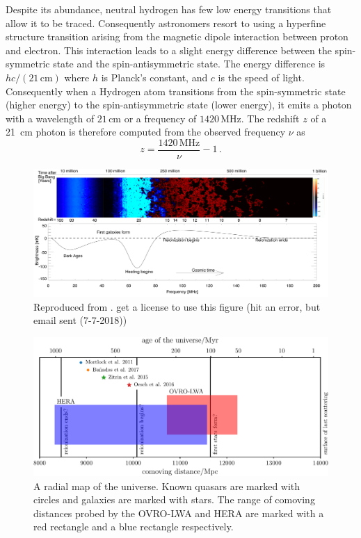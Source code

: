 \begin{bibunit}
Despite its abundance, neutral hydrogen has few low energy transitions that allow it to be traced.
Consequently astronomers resort to using a hyperfine structure transition arising from the magnetic
dipole interaction between proton and electron. This interaction leads to a slight energy difference
between the spin-symmetric state and the spin-antisymmetric state. The energy difference is $hc /
(21\,\text{cm})$ where $h$ is Planck's constant, and $c$ is the speed of light. Consequently when a
Hydrogen atom transitions from the spin-symmetric state (higher energy) to the spin-antisymmetric
state (lower energy), it emits a photon with a wavelength of $21\,\text{cm}$ or a frequency of
$1420\,\text{MHz}$. The redshift $z$ of a 21~cm photon is therefore computed from the observed
frequency $\nu$ as
\begin{equation}
    z = \frac{1420\,\text{MHz}}{\nu} - 1\,.
\end{equation}

\begin{figure}[t]
    \centering
    \includegraphics[width=\textwidth]{figures/chapter1/pritchard-2012-global-signal}
    \caption{
        Reproduced from \citet{2012RPPh...75h6901P}.
        get a license to use this figure (hit an error, but email sent (7-7-2018))
    }
    \label{fig:pritchard-global-signal}
\end{figure}

\begin{figure}[t]
    \centering
    \includegraphics[width=\textwidth]{figures/chapter1/history-of-the-universe/history-of-the-universe}
    \caption{
        A radial map of the universe. Known quasars are marked with circles and galaxies are marked
        with stars. The range of comoving distances probed by the OVRO-LWA and HERA are marked with a red
        rectangle and a blue rectangle respectively.
    }
    \label{fig:history-of-the-universe}
\end{figure}


\end{bibunit}
